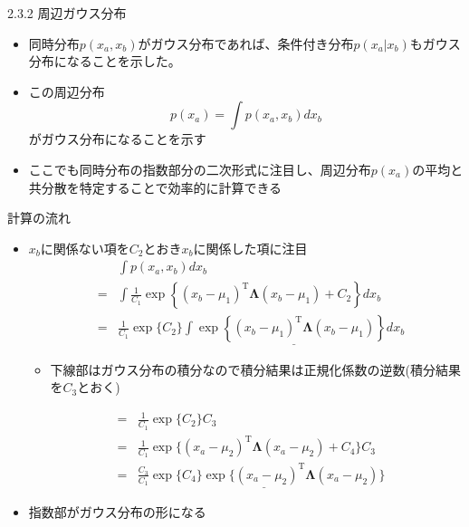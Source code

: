 \begin{frame}{2.3.2 周辺ガウス分布}
 \begin{itemize}
  \item 同時分布$p(x_a,x_b)$がガウス分布であれば、条件付き分布$p(x_a|x_b)$もガウス分布になることを示した。
  \item この周辺分布
        \begin{equation}
         p(x_a) = \int p(x_a,x_b)dx_b
        \end{equation}
        がガウス分布になることを示す
  \item ここでも同時分布の指数部分の二次形式に注目し、周辺分布$p(x_a)$の平均と共分散を特定することで効率的に計算できる
 \end{itemize}
\end{frame}


\begin{frame}{計算の流れ}
 \begin{itemize}
  \item $x_b$に関係ない項を$C_2$とおき$x_b$に関係した項に注目
        \begin{eqnarray*}
         && \int p(x_a,x_b)dx_b \\
         &=& \int \frac{1}{C_1}\exp\left\{(x_b-\mu_1)^{\mathrm{T}}\bm{\Lambda}(x_b-\mu_1)+C_2\right\}dx_b \\
         &=& \frac{1}{C_1}\exp\{C_2\}\underline{\int \exp\left\{(x_b-\mu_1)^{\mathrm{T}}\bm{\Lambda}(x_b-\mu_1)\right\}dx_b}
        \end{eqnarray*}
        \begin{itemize}
         \item 下線部はガウス分布の積分なので積分結果は正規化係数の逆数(積分結果を$C_3$とおく)
        \end{itemize}
        \begin{eqnarray*}
         &=&\frac{1}{C_1}\exp\{C_2\}C_3 \\
         &=&\frac{1}{C_1}\exp\{(x_a-\mu_2)^{\mathrm{T}}\bm{\Lambda} (x_a-\mu_2)+C_4\}C_3\\
         &=&\frac{C_3}{C_1}\underline{\exp\{C_4\}\exp\{(x_a-\mu_2)^{\mathrm{T}}\bm{\Lambda} (x_a-\mu_2)}\}
        \end{eqnarray*}
  \item 指数部がガウス分布の形になる
 \end{itemize}
\end{frame}


